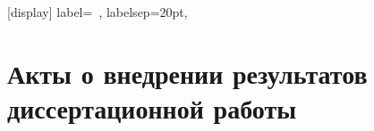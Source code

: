 \appendix
\sectionformat{\chapter}[display]{%
    label=\chaptertitlename\ \thechapter,%
    labelsep=20pt,
}
\renewcommand\thechapter{\Asbuk{chapter}} %


\chapter{Акты о внедрении результатов диссертационной работы} \label{AppendixC}

